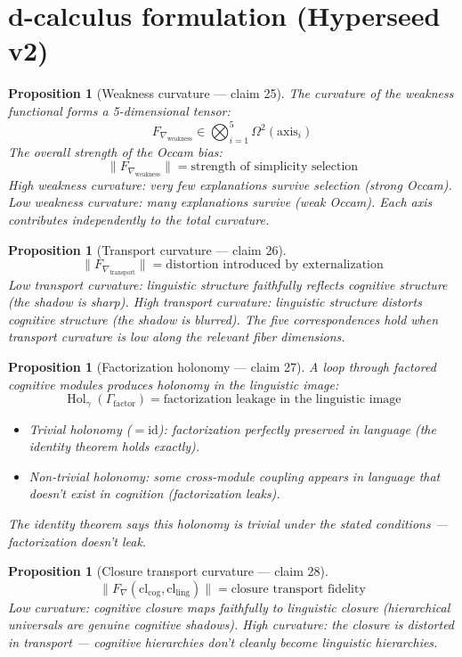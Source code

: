 \documentclass[11pt,a4paper]{article}
\newtheorem{proposition}[definition]{Proposition}
\begin{document}
\section{d-calculus formulation (Hyperseed v2)}

\begin{proposition}[Weakness curvature --- claim 25]
\label{prop:weakness_curv}
The curvature of the weakness functional forms a 5-dimensional tensor:
\[
  F_{\nabla_{\text{weakness}}} \in \bigotimes_{i=1}^{5}
    \Omega^2(\text{axis}_i)
\]
The overall strength of the Occam bias:
\[
  \|F_{\nabla_{\text{weakness}}}\| = \text{strength of simplicity
    selection}
\]
High weakness curvature: very few explanations survive selection
(strong Occam). Low weakness curvature: many explanations survive
(weak Occam). Each axis contributes independently to the total
curvature.
\end{proposition}

\begin{proposition}[Transport curvature --- claim 26]
\label{prop:transport}
\[
  \|F_{\nabla_{\text{transport}}}\| = \text{distortion introduced by
    externalization}
\]
Low transport curvature: linguistic structure faithfully reflects
cognitive structure (the shadow is sharp). High transport curvature:
linguistic structure distorts cognitive structure (the shadow is
blurred). The five correspondences hold when transport curvature is
low along the relevant fiber dimensions.
\end{proposition}

\begin{proposition}[Factorization holonomy --- claim 27]
\label{prop:factor_hol}
A loop through factored cognitive modules produces holonomy in the
linguistic image:
\[
  \operatorname{Hol}_\gamma(\Gamma_{\text{factor}}) =
    \text{factorization leakage in the linguistic image}
\]
\begin{itemize}
  \item Trivial holonomy ($= \mathrm{id}$): factorization perfectly
    preserved in language (the identity theorem holds exactly).
  \item Non-trivial holonomy: some cross-module coupling appears in
    language that doesn't exist in cognition (factorization leaks).
\end{itemize}
The identity theorem says this holonomy is trivial under the stated
conditions --- factorization doesn't leak.
\end{proposition}

\begin{proposition}[Closure transport curvature --- claim 28]
\label{prop:closure_transport}
\[
  \|F_\nabla(\text{cl}_{\text{cog}}, \text{cl}_{\text{ling}})\| =
    \text{closure transport fidelity}
\]
Low curvature: cognitive closure maps faithfully to linguistic closure
(hierarchical universals are genuine cognitive shadows). High curvature:
the closure is distorted in transport --- cognitive hierarchies don't
cleanly become linguistic hierarchies.
\end{proposition}
\end{document}
